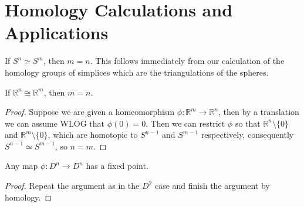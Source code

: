 \section{Homology Calculations and Applications}
\begin{example}
    If $S^n\simeq S^m$, then $m=n$.
    This follows immediately from our calculation of the homology groups of simplices which are the triangulations of the spheres.
\end{example}
\begin{theorem}
    If $\mathbb R^n\cong\mathbb R^m$, then $m=n$.
\end{theorem}
\begin{proof}
    Suppose we are given a homeomorphism $\phi:\mathbb R^m\to\mathbb R^n$, then by a translation we can assume WLOG that $\phi(0)=0$.
    Then we can restrict $\phi$ so that $\mathbb R^n\setminus\{0\}$ and $\mathbb R^m\setminus\{0\}$, which are homotopic to $S^{n-1}$ and $S^{m-1}$ respectively, consequently $S^{n-1}\simeq S^{m-1}$, so $n=m$.
\end{proof}
\begin{proposition}
    Any map $\phi:D^n\to D^n$ has a fixed point.
\end{proposition}
\begin{proof}
    Repeat the argument as in the $D^2$ case and finish the argument by homology.
\end{proof}
